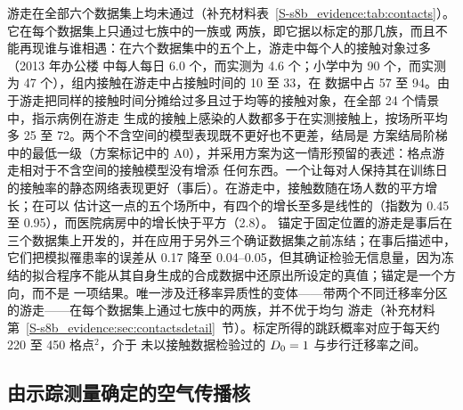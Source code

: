 游走在全部六个数据集上均未通过（补充材料表~\ref{S-s8b_evidence:tab:contacts}）。它在每个数据集上只通过七族中的一族或
两族，即它据以标定的那几族，而且不能再现谁与谁相遇：在六个数据集中的五个上，游走中每个人的接触对象过多（2013 年办公楼
中每人每日 6.0 个，而实测为 4.6 个；小学中为 90 个，而实测为 47 个），组内接触在游走中占接触时间的 10 至 33\pct{}，在
数据中占 57 至 94\pct{}。由于游走把同样的接触时间分摊给过多且过于均等的接触对象，在全部 24 个情景中，指示病例在游走
生成的接触上感染的人数都多于在实测接触上，按场所平均多 25 至 72\pct{}。两个不含空间的模型表现既不更好也不更差，结局是
方案结局阶梯中的最低一级（方案标记中的 A0），并采用方案为这一情形预留的表述：格点游走相对于不含空间的接触模型没有增添
任何东西。一个让每对人保持其在训练日的接触率的静态网络表现更好（事后）。在游走中，接触数随在场人数的平方增长；在可以
估计这一点的五个场所中，有四个的增长至多是线性的（指数为 0.45 至 0.95），而医院病房中的增长快于平方（2.8）。
锚定于固定位置的游走是事后在三个数据集上开发的，并在应用于另外三个确证数据集之前冻结；在事后描述中，它们把模拟罹患率的误差从
0.17 降至 0.04--0.05，但其确证检验无信息量，因为冻结的拟合程序不能从其自身生成的合成数据中还原出所设定的真值；锚定是一个方向，而不是
一项结果。唯一涉及迁移率异质性的变体——带两个不同迁移率分区的游走——在每个数据集上通过七族中的两族，并不优于均匀
游走（补充材料第~\ref{S-s8b_evidence:sec:contactsdetail}~节）。标定所得的跳跃概率对应于每天约 220 至 450 格点$^2$，介于
未以接触数据检验过的 $D_0=1$ 与步行迁移率之间。

\subsection{由示踪测量确定的空气传播核}\label{s8b_evidence:sec:tracer}

